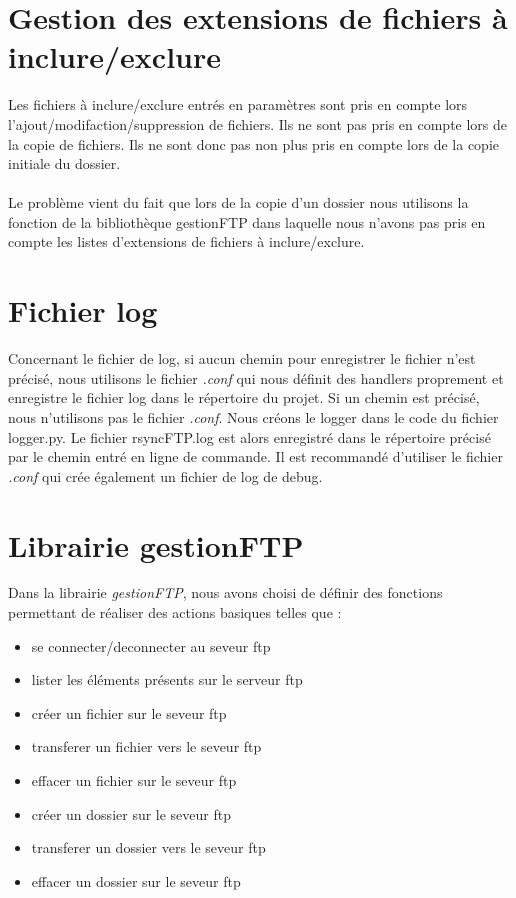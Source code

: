 \section{Gestion des extensions de fichiers à inclure/exclure}

Les fichiers à inclure/exclure entrés en paramètres sont pris en compte lors l'ajout/modifaction/suppression de fichiers.
Ils ne sont pas pris en compte lors de la copie de fichiers.
Ils ne sont donc pas non plus pris en compte lors de la copie initiale du dossier.\\
\\
Le problème vient du fait que lors de la copie d'un dossier nous utilisons la fonction de la bibliothèque gestionFTP dans laquelle
nous n'avons pas pris en compte les listes d'extensions de fichiers à inclure/exclure.

\section{Fichier log}

Concernant le fichier de log, si aucun chemin pour enregistrer le fichier n'est précisé, nous utilisons le fichier \textit{.conf} 
qui nous définit des handlers proprement et enregistre le fichier log dans le répertoire du projet.
Si un chemin est précisé, nous n'utilisons pas le fichier \textit{.conf}. 
Nous créons le logger dans le code du fichier logger.py. 
Le fichier rsyncFTP.log est alors enregistré dans le répertoire précisé par le chemin entré en ligne de commande.
Il est recommandé d'utiliser le fichier \textit{.conf} qui crée également un fichier de log de debug.

\section{Librairie gestionFTP}

Dans la librairie \textit{gestionFTP}, nous avons choisi de définir des fonctions permettant de réaliser des actions basiques telles que : 
\begin{itemize}
\item se connecter/deconnecter au seveur ftp
\item lister les éléments présents sur le serveur ftp
\item créer un fichier sur le seveur ftp
\item transferer un fichier vers le seveur ftp
\item effacer un fichier sur le seveur ftp
\item créer un dossier sur le seveur ftp
\item transferer un dossier vers le seveur ftp
\item effacer un dossier sur le seveur ftp
\end{itemize}

